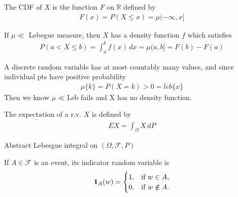 \documentclass[11pt]{article}
\begin{document}
\begin{definition}
    The CDF of $X$ is the function $F$ on $\mathbb{R}$ defined by 
    \begin{align*}
        F(x) = P(X \le x) = \mu(-\infty,x]
    \end{align*}
\end{definition}
\begin{definition}
    If $\mu \ll $ Lebegue measure, then $X$ has a density function $f$ which satisfies 
    \begin{align*}
        P(a < X \le b) = \int _{a}^{b} f(x) \, dx = \mu(a,b] = F(b) - F(a)
    \end{align*}
\end{definition}

\begin{remark}
    A $\underline{\text{discrete random variable}}$ has at most countably many values, and since individual pts have
    positive probability
    \begin{align*}
        \mu \{k\} = P(X=k) > 0 = leb\{x\}
    \end{align*}
    Then we know $\mu \ll $Leb fails and X has no density function.
\end{remark}


\begin{definition}
    The $\underline{\text{expectation}}$ of a r.v. $X$ is defined by 
    \begin{align*}
        EX = \int_{\Omega} X \, dP
    \end{align*}
    \begin{remark}
        Abstract Lebesgue integral on $(\Omega, \mathcal{F}, P)$
    \end{remark}
\end{definition}

\begin{definition}
    If $A \in \mathcal{F}$ is an event, its indicator random variable is 
    \[
    \bm{1} _{A}(w) = 
    \begin{cases} 
        1, & \text{if } w \in A, \\
        0, & \text{if } w \notin A.
    \end{cases}
    \]
\end{definition}
\end{document}
